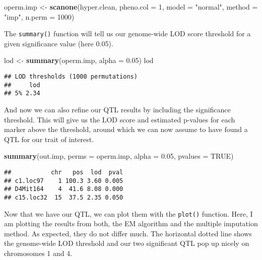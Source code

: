 \documentclass[12pt,]{krantz}
\newenvironment{Shaded}{\begin{snugshade}}{\end{snugshade}}
\newcommand{\KeywordTok}[1]{\textcolor[rgb]{0.27,0.27,0.27}{\textbf{{#1}}}}
\newcommand{\DataTypeTok}[1]{\textcolor[rgb]{0.27,0.27,0.27}{{#1}}}
\newcommand{\DecValTok}[1]{\textcolor[rgb]{0.06,0.06,0.06}{{#1}}}
\newcommand{\FloatTok}[1]{\textcolor[rgb]{0.06,0.06,0.06}{{#1}}}
\newcommand{\StringTok}[1]{\textcolor[rgb]{0.5,0.5,0.5}{{#1}}}
\newcommand{\OtherTok}[1]{\textcolor[rgb]{0.37,0.37,0.37}{{#1}}}
\newcommand{\NormalTok}[1]{{#1}}
\theoremstyle{definition}
\theoremstyle{definition}
\theoremstyle{remark}
\begin{document}
\begin{Shaded}
\begin{Highlighting}[]
\NormalTok{operm.imp <-}\StringTok{ }\KeywordTok{scanone}\NormalTok{(hyper.clean, }\DataTypeTok{pheno.col =} \DecValTok{1}\NormalTok{, }\DataTypeTok{model =} \StringTok{"normal"}\NormalTok{, }
                     \DataTypeTok{method =} \StringTok{"imp"}\NormalTok{, }\DataTypeTok{n.perm =} \DecValTok{1000}\NormalTok{)}
\end{Highlighting}
\end{Shaded}

The \texttt{summary()} function will tell us our genome-wide LOD score
threshold for a given significance value (here 0.05).

\begin{Shaded}
\begin{Highlighting}[]
\NormalTok{lod <-}\StringTok{ }\KeywordTok{summary}\NormalTok{(operm.imp, }\DataTypeTok{alpha =} \FloatTok{0.05}\NormalTok{)}
\NormalTok{lod}
\end{Highlighting}
\end{Shaded}

\begin{verbatim}
## LOD thresholds (1000 permutations)
##     lod
## 5% 2.34
\end{verbatim}

And now we can also refine our QTL results by including the significance
threshold. This will give us the LOD score and estimated p-values for
each marker above the threshold, around which we can now assume to have
found a QTL for our trait of interest.

\begin{Shaded}
\begin{Highlighting}[]
\KeywordTok{summary}\NormalTok{(out.imp, }\DataTypeTok{perms =} \NormalTok{operm.imp, }\DataTypeTok{alpha =} \FloatTok{0.05}\NormalTok{, }\DataTypeTok{pvalues =} \OtherTok{TRUE}\NormalTok{)}
\end{Highlighting}
\end{Shaded}

\begin{verbatim}
##           chr   pos  lod  pval
## c1.loc97    1 100.3 3.60 0.005
## D4Mit164    4  41.6 8.08 0.000
## c15.loc32  15  37.5 2.35 0.050
\end{verbatim}

Now that we have our QTL, we can plot them with the \texttt{plot()}
function. Here, I am plotting the results from both, the EM algorithm
and the multiple imputation method. As expected, they do not differ
much. The horizontal dotted line shows the genome-wide LOD threshold and
our two significant QTL pop up nicely on chromosomes 1 and 4.
\end{document}
